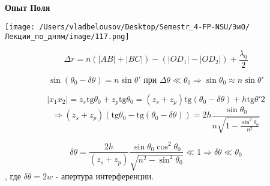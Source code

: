 \documentclass[12pt, a4paper]{report}
\begin{document}
\textbf{Опыт Поля} 

\begin{center}
    \texttt{[image: /Users/vladbelousov/Desktop/Semestr\_4-FP-NSU/ЭиО/Лекции\_по\_дням/image/117.png]}
\end{center}

\[ \Delta r = n \left( |AB| + |BC| \right) - (|O D_1     |- |O D_2   |) + \frac{\lambda_0}{2 }  \] 

\[ \sin (\theta_0 - \delta \theta  )  = n \sin \theta' \text{ при }  \Delta \theta \ll \theta_0 \Rightarrow \sin \theta_0 \approx n \sin \theta'  \] 

\[ |x_1 x_2 | = z_s \mathrm{tg }  \theta_0 + z_p \mathrm{tg }   \theta_0 = (z_s + z_p ) \mathrm{tg }  (\theta_0 - \delta \theta ) + h \mathrm{tg }  \theta ' 2     \] 
\[ \Rightarrow (z_s + z_p )(\mathrm{tg }  \theta_0 - \mathrm{tg }  (\theta_0 - \delta \theta )  ) = 2h \frac{\sin \theta_0 }{n \sqrt{\displaystyle  1 - \frac{\sin  ^2 \theta_0 }{n ^2 } }} \] 

\[ \delta \theta = \frac{2h}{(z_s +z_p )} \frac{\sin  \theta_0 \cos  ^2 \theta_0 }{\sqrt{n ^2 - \sin  ^2 \theta_0 }} \ll 1  \Rightarrow \delta \theta \ll \theta_0  \] 
, где \( \delta \theta  = 2w \)  - апертура интерференции.




\ifdefined\mainfile
\else
    
\end{document}
